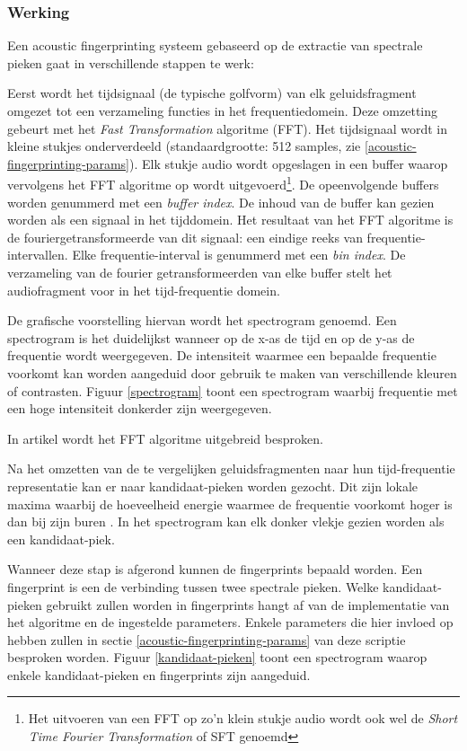 \subsubsection{Werking}

Een acoustic fingerprinting systeem gebaseerd op de extractie van spectrale pieken gaat in verschillende stappen te werk: 

Eerst wordt het tijdsignaal (de typische golfvorm) van elk geluidsfragment omgezet tot een verzameling functies in het frequentiedomein. Deze omzetting gebeurt met het \textit{Fast  Transformation} algoritme (FFT). Het tijdsignaal wordt in kleine stukjes onderverdeeld (standaardgrootte: 512 samples, zie \ref{acoustic-fingerprinting-params}). Elk stukje audio wordt opgeslagen in een buffer waarop vervolgens het FFT algoritme op wordt uitgevoerd\footnote{Het uitvoeren van een FFT op zo'n klein stukje audio wordt ook wel de \textit{Short Time Fourier Transformation} of SFT genoemd}. De opeenvolgende buffers worden genummerd met een \textit{buffer index}. De inhoud van de buffer kan gezien worden als een signaal in het tijddomein. Het resultaat van het FFT algoritme is de fouriergetransformeerde van dit signaal: een eindige reeks van frequentie-intervallen. Elke frequentie-interval is genummerd met een \textit{bin index}. De verzameling van de fourier getransformeerden van elke buffer stelt het audiofragment voor in het tijd-frequentie domein.

De grafische voorstelling hiervan wordt het spectrogram genoemd. Een spectrogram is het duidelijkst wanneer op de x-as de tijd en op de y-as de frequentie wordt weergegeven. De intensiteit waarmee een bepaalde frequentie voorkomt kan worden aangeduid door gebruik te maken van verschillende kleuren of contrasten. Figuur \ref{spectrogram} toont een spectrogram waarbij frequentie met een hoge intensiteit donkerder zijn weergegeven.

In artikel \cite{oppenheim1970speech} wordt het FFT algoritme uitgebreid besproken.

Na het omzetten van de te vergelijken geluidsfragmenten naar hun tijd-frequentie representatie kan er naar kandidaat-pieken worden gezocht. Dit zijn lokale maxima waarbij de hoeveelheid energie waarmee de frequentie voorkomt hoger is dan bij zijn buren \cite{six2014panako}. In het spectrogram kan elk donker vlekje gezien worden als een kandidaat-piek.

Wanneer deze stap is afgerond kunnen de fingerprints bepaald worden. Een fingerprint is een de verbinding tussen twee spectrale pieken. Welke kandidaat-pieken gebruikt zullen worden in fingerprints hangt af van de implementatie van het algoritme en de ingestelde parameters. Enkele parameters die hier invloed op hebben zullen in sectie \ref{acoustic-fingerprinting-params} van deze scriptie besproken worden. Figuur \ref{kandidaat-pieken} toont een spectrogram waarop enkele kandidaat-pieken en fingerprints zijn aangeduid.

